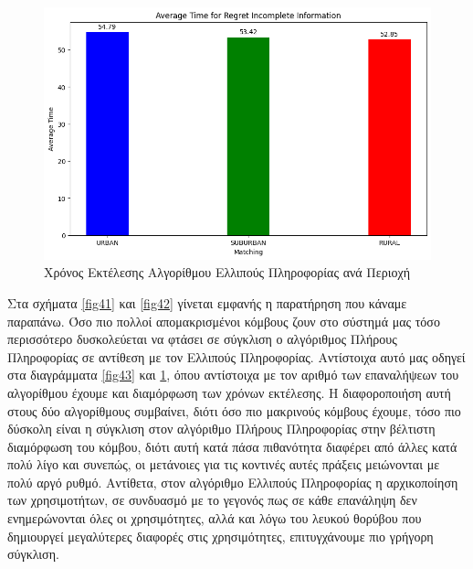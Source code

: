 \begin{figure}[H]
    \centering
    \includegraphics[width=\textwidth]{figures/chapter4/Average_Time_per_area_RII.png}
    \caption{Χρόνος Εκτέλεσης Αλγορίθμου Ελλιπούς Πληροφορίας ανά Περιοχή}
    \label{fig44}
\end{figure}

Στα σχήματα \ref{fig41} και \ref{fig42} γίνεται εμφανής η παρατήρηση που κάναμε παραπάνω. Όσο πιο πολλοί απομακρισμένοι κόμβους ζουν στο σύστημά μας τόσο περισσότερο δυσκολεύεται να φτάσει σε σύγκλιση ο αλγόριθμος Πλήρους Πληροφορίας σε αντίθεση με τον Ελλιπούς Πληροφορίας. Αντίστοιχα αυτό μας οδηγεί στα διαγράμματα \ref{fig43} και \ref{fig44}, όπου αντίστοιχα με τον αριθμό των επαναλήψεων του αλγορίθμου έχουμε και διαμόρφωση των χρόνων εκτέλεσης. Η διαφοροποιήση αυτή στους δύο αλγορίθμους συμβαίνει, διότι όσο πιο μακρινούς κόμβους έχουμε, τόσο πιο δύσκολη είναι η σύγκλιση στον αλγόριθμο Πλήρους Πληροφορίας στην βέλτιστη διαμόρφωση του κόμβου, διότι αυτή κατά πάσα πιθανότητα διαφέρει από άλλες κατά πολύ λίγο και συνεπώς, οι μετάνοιες για τις κοντινές αυτές πράξεις μειώνονται με πολύ αργό ρυθμό. Αντίθετα, στον αλγόριθμο Ελλιπούς Πληροφορίας η αρχικοποίηση των χρησιμοτήτων, σε συνδυασμό με το γεγονός πως σε κάθε επανάληψη δεν ενημερώνονται όλες οι χρησιμότητες, αλλά και λόγω του λευκού θορύβου που δημιουργεί μεγαλύτερες διαφορές στις χρησιμότητες, επιτυγχάνουμε πιο γρήγορη σύγκλιση.

\newpage

